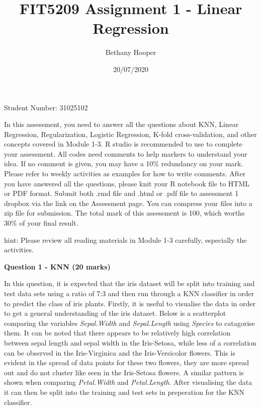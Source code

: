\documentclass[
]{article}
\title{FIT5209 Assignment 1 - Linear Regression}
\author{Bethany Hooper}
\date{20/07/2020}
\begin{document}
\maketitle

Student Number: 31025102

In this assessment, you need to answer all the questions about KNN,
Linear Regression, Regularization, Logistic Regression, K-fold
cross-validation, and other concepts covered in Module 1-3. R studio is
recommended to use to complete your assessment. All codes need comments
to help markers to understand your idea. If no comment is given, you may
have a 10\% redundancy on your mark. Please refer to weekly activities
as examples for how to write comments. After you have answered all the
questions, please knit your R notebook file to HTML or PDF format.
Submit both .rmd file and .html or .pdf file to assessment 1 dropbox via
the link on the Assessment page. You can compress your files into a zip
file for submission. The total mark of this assessment is 100, which
worths 30\% of your final result.

hint: Please review all reading materials in Module 1-3 carefully,
especially the activities.

\textbf{Question 1 - KNN (20 marks)}

In this question, it is expected that the iris dataset will be split
into training and test data sets using a ratio of 7:3 and then run
through a KNN classifier in order to predict the class of iris plants.
Firstly, it is useful to visualise the data in order to get a general
understanding of the iris dataset. Below is a scatterplot comparing the
variables \emph{Sepal.Width} and \emph{Sepal.Length} using
\emph{Species} to catagorise them. It can be noted that there appears to
be relatively high correlation between sepal length and sepal width in
the Iris-Setosa, while less of a correlation can be observed in the
Iris-Virginica and the Iris-Versicolor flowers. This is evident in the
spread of data points for these two flowers, they are more spread out
and do not cluster like seen in the Iris-Setosa flowers. A similar
pattern is shown when comparing \emph{Petal.Width} and
\emph{Petal.Length}. After visualising the data it can then be split
into the training and test sets in preperation for the KNN classifier.
\end{document}
